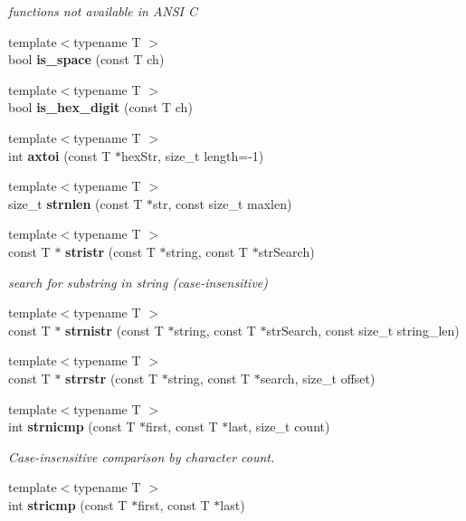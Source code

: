 \begin{DoxyCompactItemize}
\begin{DoxyCompactList}\small\item\em functions not available in A\+N\+SI C \end{DoxyCompactList}\item 
{\footnotesize template$<$typename T $>$ }\\bool {\bf is\+\_\+space} (const T ch)
\item 
{\footnotesize template$<$typename T $>$ }\\bool {\bf is\+\_\+hex\+\_\+digit} (const T ch)
\item 
{\footnotesize template$<$typename T $>$ }\\int {\bf axtoi} (const T $\ast$hex\+Str, size\+\_\+t length=-\/1)
\item 
{\footnotesize template$<$typename T $>$ }\\size\+\_\+t {\bf strnlen} (const T $\ast$str, const size\+\_\+t maxlen)
\item 
{\footnotesize template$<$typename T $>$ }\\const T $\ast$ {\bf stristr} (const T $\ast$string, const T $\ast$str\+Search)\label{namespacestring__util_aefacc16446da64a7897ef698f5006b6e}

\begin{DoxyCompactList}\small\item\em search for substring in string (case-\/insensitive) \end{DoxyCompactList}\item 
{\footnotesize template$<$typename T $>$ }\\const T $\ast$ {\bf strnistr} (const T $\ast$string, const T $\ast$str\+Search, const size\+\_\+t string\+\_\+len)
\item 
{\footnotesize template$<$typename T $>$ }\\const T $\ast$ {\bf strrstr} (const T $\ast$string, const T $\ast$search, size\+\_\+t offset)
\item 
{\footnotesize template$<$typename T $>$ }\\int {\bf strnicmp} (const T $\ast$first, const T $\ast$last, size\+\_\+t count)\label{namespacestring__util_ab636487921427be3e286cc5cd46e6cc5}

\begin{DoxyCompactList}\small\item\em Case-\/insensitive comparison by character count. \end{DoxyCompactList}\item 
{\footnotesize template$<$typename T $>$ }\\int {\bf stricmp} (const T $\ast$first, const T $\ast$last)\label{namespacestring__util_a11e8f2f285edc9abd73199db60dc589a}


\end{DoxyCompactItemize}

